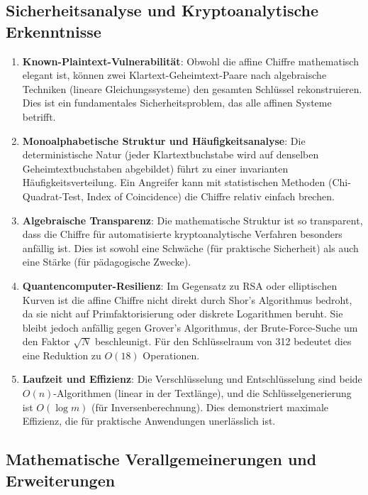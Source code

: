 ﻿\documentclass[12pt,a4paper]{article}
\begin{document}
	\subsection{Sicherheitsanalyse und Kryptoanalytische Erkenntnisse}
	
	\begin{enumerate}
		\item \textbf{Known-Plaintext-Vulnerabilität}: Obwohl die affine Chiffre mathematisch elegant ist, können zwei Klartext-Geheimtext-Paare nach algebraische Techniken (lineare Gleichungssysteme) den gesamten Schlüssel rekonstruieren. Dies ist ein fundamentales Sicherheitsproblem, das alle affinen Systeme betrifft.
		
		\item \textbf{Monoalphabetische Struktur und Häufigkeitsanalyse}: Die deterministische Natur (jeder Klartextbuchstabe wird auf denselben Geheimtextbuchstaben abgebildet) führt zu einer invarianten Häufigkeitsverteilung. Ein Angreifer kann mit statistischen Methoden (Chi-Quadrat-Test, Index of Coincidence) die Chiffre relativ einfach brechen.
		
		\item \textbf{Algebraische Transparenz}: Die mathematische Struktur ist so transparent, dass die Chiffre für automatisierte kryptoanalytische Verfahren besonders anfällig ist. Dies ist sowohl eine Schwäche (für praktische Sicherheit) als auch eine Stärke (für pädagogische Zwecke).
		
		\item \textbf{Quantencomputer-Resilienz}: Im Gegensatz zu RSA oder elliptischen Kurven ist die affine Chiffre nicht direkt durch Shor's Algorithmus bedroht, da sie nicht auf Primfaktorisierung oder diskrete Logarithmen beruht. Sie bleibt jedoch anfällig gegen Grover's Algorithmus, der Brute-Force-Suche um den Faktor $\sqrt{N}$ beschleunigt. Für den Schlüsselraum von 312 bedeutet dies eine Reduktion zu $O(18)$ Operationen.
		
		\item \textbf{Laufzeit und Effizienz}: Die Verschlüsselung und Entschlüsselung sind beide $O(n)$-Algorithmen (linear in der Textlänge), und die Schlüsselgenerierung ist $O(\log m)$ (für Inversenberechnung). Dies demonstriert maximale Effizienz, die für praktische Anwendungen unerlässlich ist.
	\end{enumerate}
	
	\subsection{Mathematische Verallgemeinerungen und Erweiterungen}
	
\end{document}
